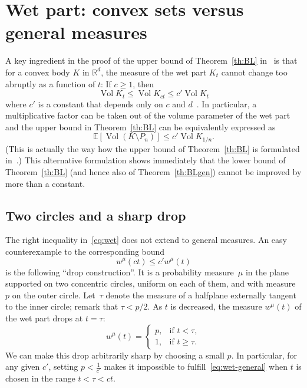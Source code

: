 \documentclass[AHL,Unicode,longabstracts]{cedram}
\DeclareMathOperator{\vol}{Vol}
\newcommand{\Rbb}{\mathbb{R}}%
\newcommand{\Ebb}{\mathbb{E}}%
\begin{document}
\section{Wet part: convex sets versus general measures}\label{s:regularity}

A key ingredient in the proof of the upper bound of Theorem~\ref{th:BL} in~\cite{BarLar} is that for a convex body $K$ in $\Rbb^d$, the measure of the wet part $K_t$ cannot change too abruptly as a function of $t$: If $c\ge 1$, then
\begin{equation}\label{eq:wet}
\vol K_t \le \vol K_{ct} \le c' \vol K_t
\end{equation}
where $c'$ is a constant that depends only on $c$ and $d$~\cite[Theorem~7]{BarLar}. In particular, a multiplicative factor can be taken out of the volume parameter of the wet part and the upper bound in Theorem~\ref{th:BL} can be equivalently expressed as
\begin{equation}\label{eq:alternative}
\Ebb[\vol(K\setminus P_n)] \le c' \vol K_{1/n}.
\end{equation}
(This is actually the way how the upper bound of Theorem~\ref{th:BL} is formulated in~\cite[Theorem~1]{BarLar}.) This alternative formulation shows immediately that the lower bound of Theorem~\ref{th:BL} (and hence also of Theorem~\ref{th:BLgen}) cannot be improved by more than a constant.


\subsection{Two circles and a sharp drop}

The right inequality in~\eqref{eq:wet} does not extend to general measures. An easy counterexample to the corresponding bound
\begin{equation}\label{eq:wet-general}
w^\mu(ct) \le c' w^\mu (t)
\end{equation}
is the following ``drop construction''. It is a probability measure~$\mu$ in the plane supported on two concentric circles, uniform on each of them, and with measure $p$ on the outer circle. Let~$\tau$ denote the measure of a halfplane externally tangent to the inner circle; remark that $\tau<p/2$. As $t$ is decreased, the measure $w^\mu(t)$ of the wet part drops at $t=\tau$:
\begin{equation}\label{eq:one-drop}
w^\mu(t) =
\begin{cases}
p, & \text{if } t < \tau,\\
1, & \text{if } t \ge \tau.
\end{cases}
\end{equation}
We can make this drop arbitrarily sharp by choosing a small $p$. In particular, for any given $c'$, setting $p < \frac1{c'}$ makes it impossible to fulfill~\eqref{eq:wet-general} when $t$ is chosen in the range $t<\tau<ct$.
\end{document}
